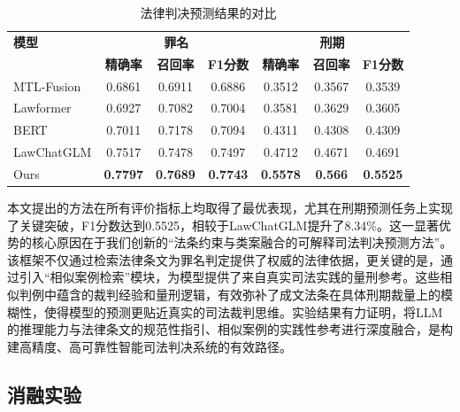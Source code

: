 \begin{table}[htbp]
	\centering
	\begin{tabular}{lcccccc}
		\toprule
		\textbf{模型} & \multicolumn{3}{c}{\textbf{罪名}} & \multicolumn{3}{c}{\textbf{刑期}}                                                                        \\
		\cmidrule(lr){2-4} \cmidrule(lr){5-7}
		& \textbf{精确率}                    & \textbf{召回率}                    & \textbf{F1分数}   & \textbf{精确率}    & \textbf{召回率}   & \textbf{F1分数}   \\
		\midrule
		MTL-Fusion  & 0.6861                          & 0.6911                          & 0.6886          & 0.3512          & 0.3567         & 0.3539          \\
		Lawformer   & 0.6927                          & 0.7082                          & 0.7004          & 0.3581          & 0.3629         & 0.3605          \\
		BERT        & 0.7011                          & 0.7178                          & 0.7094          & 0.4311          & 0.4308         & 0.4309          \\
		LawChatGLM  & 0.7517                          & 0.7478                          & 0.7497          & 0.4712          & 0.4671         & 0.4691          \\
		Ours        & \textbf{0.7797}                 & \textbf{0.7689}                 & \textbf{0.7743} & \textbf{0.5578} & \textbf{0.566} & \textbf{0.5525} \\
		\bottomrule
	\end{tabular}
	\caption{ 法律判决预测结果的对比}
	\label{tab:performance_comparison}
\end{table}

本文提出的方法在所有评价指标上均取得了最优表现，尤其在刑期预测任务上实现了关键突破，F1分数达到0.5525，相较于LawChatGLM提升了8.34\%。这一显著优势的核心原因在于我们创新的“法条约束与类案融合的可解释司法判决预测方法”。该框架不仅通过检索法律条文为罪名判定提供了权威的法律依据，更关键的是，通过引入“相似案例检索”模块，为模型提供了来自真实司法实践的量刑参考。这些相似判例中蕴含的裁判经验和量刑逻辑，有效弥补了成文法条在具体刑期裁量上的模糊性，使得模型的预测更贴近真实的司法裁判思维。实验结果有力证明，将LLM的推理能力与法律条文的规范性指引、相似案例的实践性参考进行深度融合，是构建高精度、高可靠性智能司法判决系统的有效路径。


\subsection{\heiti 消融实验}

